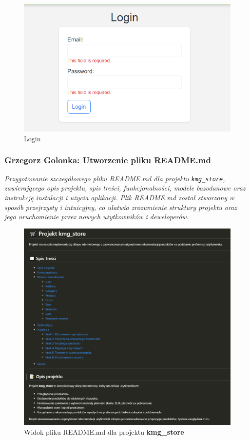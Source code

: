 \documentclass[12pt,a4paper,oneside]{article}
\theoremstyle{definition}
\numberwithin{equation}{section}
\begin{document}
\begin{figure}[H]
    \centering
    \includegraphics[width=0.8\columnwidth]{images/krzysztofBImages/register-login/login.png}
    \caption{Login}
    \label{login}
\end{figure}



\subsubsection{Grzegorz Golonka: Utworzenie pliku README.md }
\label{section:1.3.19}
\textit{Przygotowanie szczegółowego pliku README.md dla projektu \texttt{kmg\_store},
 zawierającego opis projektu, spis treści, funkcjonalności,
 modele bazodanowe oraz instrukcję instalacji i użycia aplikacji.
Plik README.md został stworzony w sposób przejrzysty i intuicyjny,
co ułatwia zrozumienie struktury projektu oraz jego uruchomienie przez nowych użytkowników i deweloperów.}
\begin{figure}[H]
    \centering
    \includegraphics[width=0.9\columnwidth]{images/krzysztofBImages/readme_preview.png}
    \caption{Widok pliku README.md dla projektu \textbf{kmg\_store}}
\end{figure}
%
%
\end{document}
